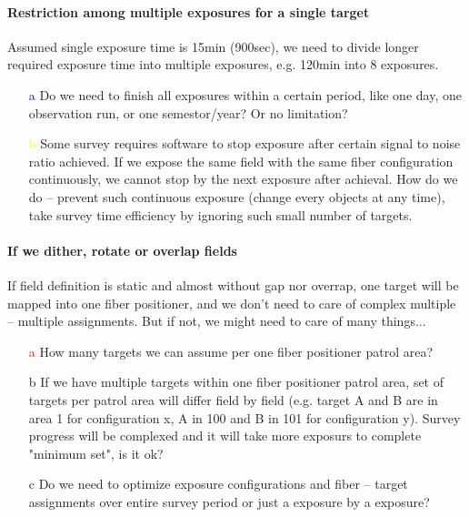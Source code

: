 \documentclass[a4paper,notitlepage]{article}
\newcommand{\cols}[1]{\textcolor{red}{#1}}
\newcommand{\colm}[1]{\textcolor{yellow}{#1}}
\newcommand{\coll}[1]{\textcolor{blue}{#1}}
\begin{document}
\paragraph{Restriction among multiple exposures for a single target}

Assumed single exposure time is 15min (900sec), we need to divide longer 
required exposure time into multiple exposures, e.g. 120min into 8 exposures. 

\begin{enumerate}
  \item[\coll{a}] Do we need to finish all exposures within a certain period, like 
    one day, one observation run, or one semestor/year? Or no limitation? 
  \item[\colm{b}] Some survey requires software to stop exposure after certain 
    signal to noise ratio achieved. 
    If we expose the same field with the same fiber configuration
    continuously, we cannot stop by the next exposure after achieval. 
    How do we do -- prevent such continuous exposure (change every objects 
    at any time), take survey time efficiency by ignoring such small number of 
    targets.
\end{enumerate}


\paragraph{If we dither, rotate or overlap fields}

If field definition is static and almost without gap nor overrap, 
one target will be mapped into one fiber positioner, and we don't need to 
care of complex multiple -- multiple assignments. 
But if not, we might need to care of many things... 

\begin{enumerate}
  \item[\cols{a}] How many targets we can assume per one fiber positioner patrol 
    area?
  \item[b] If we have multiple targets within one fiber positioner patrol 
    area, set of targets per patrol area will differ field by field 
    (e.g. target A and B are in area 1 for configuration x, 
    A in 100 and B in 101 for configuration y). 
    Survey progress will be complexed and it will take more exposurs to 
    complete "minimum set", is it ok?
  \item[c] Do we need to optimize exposure configurations and fiber -- target 
    assignments over entire survey period or just a exposure by a exposure? 
\end{enumerate}
\end{document}
